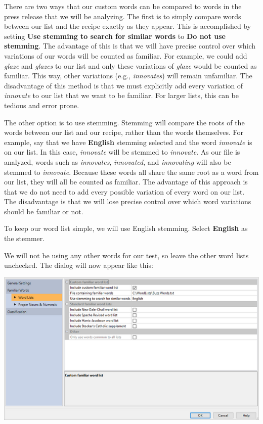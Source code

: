 \documentclass[
]{book}
\theoremstyle{definition}
\theoremstyle{definition}
\theoremstyle{definition}
\theoremstyle{definition}
\theoremstyle{remark}
\begin{document}
There are two ways that our custom words can be compared to words in the press release that we will be analyzing. The first is to simply compare words between our list and the recipe exactly as they appear. This is accomplished by setting \textbf{Use stemming to search for similar words} to \textbf{Do not use stemming}. The advantage of this is that we will have precise control over which variations of our words will be counted as familiar. For example, we could add \emph{glaze} and \emph{glazes} to our list and only these variations of \emph{glaze} would be counted as familiar. This way, other variations (e.g., \emph{innovates}) will remain unfamiliar. The disadvantage of this method is that we must explicitly add every variation of \emph{innovate} to our list that we want to be familiar. For larger lists, this can be tedious and error prone.

The other option is to use stemming. Stemming will compare the roots of the words between our list and our recipe, rather than the words themselves. For example, say that we have \textbf{English} stemming selected and the word \emph{innovate} is on our list. In this case, \emph{innovate} will be stemmed to \emph{innovate}. As our file is analyzed, words such as \emph{innovates}, \emph{innovated}, and \emph{innovating} will also be stemmed to \emph{innovate}. Because these words all share the same root as a word from our list, they will all be counted as familiar. The advantage of this approach is that we do not need to add every possible variation of every word on our list. The disadvantage is that we will lose precise control over which word variations should be familiar or not.

To keep our word list simple, we will use English stemming. Select \textbf{English} as the stemmer.

We will not be using any other words for our test, so leave the other word lists unchecked. The dialog will now appear like this:

\includegraphics{Images/CustomIndexTestExampleWordSettingsFinished.png}
\end{document}

